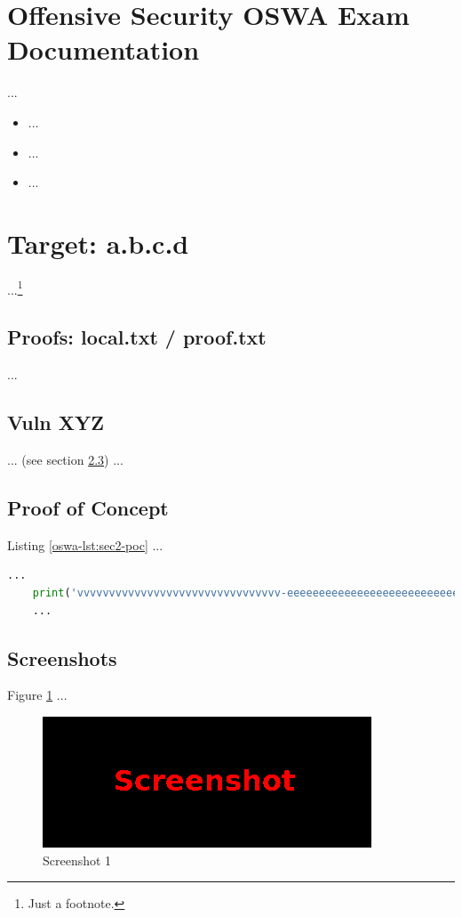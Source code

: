 %
%
%
\section{Offensive Security OSWA Exam Documentation}\label{oswa-sec:sec1}
%
...

\begin{itemize}
    \item ...
    \item ...
    \item ...
\end{itemize}
%
%
%
\section{Target: a.b.c.d}\label{oswa-sec:sec2}
%
...\footnote{Just a footnote.}
%
%
%
\subsection{Proofs: local.txt / proof.txt}\label{oswa-sec:sec2-proofs}
%
...~\cite{MitreAttack}
%
%
%
\subsection{Vuln XYZ}\label{oswa-sec:sec2-vuln}
%
... (see section \ref{oswa-sec:sec2-poc}) ...

%
%
%
\subsection{Proof of Concept}\label{oswa-sec:sec2-poc}
%
Listing \ref{oswa-lst:sec2-poc} ...\\

\begin{lstlisting}[language=Python,caption={Proof of Concept}, label={oswa-lst:sec2-poc}]
    ...
    print('vvvvvvvvvvvvvvvvvvvvvvvvvvvvvvvv-eeeeeeeeeeeeeeeeeeeeeeeeeeeeeeeeeeeeeeeeeee-looooooooooooooooooooooong-striiiiiiiiiiiiiing')
    ...
\end{lstlisting}
%
%
%
\subsection{Screenshots}\label{oswa-sec:sec2-screens}
%
Figure \ref{oswa-fig:sec2-screen1} ...

\begin{figure}[H]
    \centering
    \includegraphics[width=\textwidth]{img/assignment1/screen1.png}
    \caption{Screenshot 1}\label{oswa-fig:sec2-screen1}
\end{figure}
%
%
%
